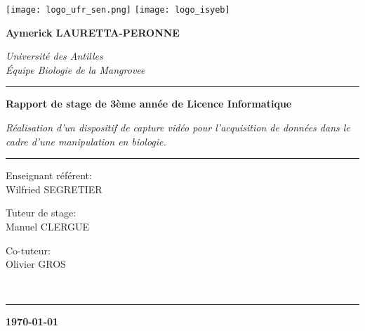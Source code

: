 \begin{titlepage}
    \begin{center}

        \texttt{[image: logo\_ufr\_sen.png]}
        \hspace{2cm}
        \texttt{[image: logo\_isyeb]} \\[2cm]
        \hspace{2cm}

        \textbf{\large{Aymerick LAURETTA-PERONNE}} \\

        \vspace{0.5cm}
                
		\textsl{\large{Université des Antilles}} \\[0.1cm]
        \small{\textit{Équipe Biologie de la Mangrovee}} \\[1cm]

        \vspace{1.5cm}

        \rule{\linewidth}{0.5mm}
        \textbf{Rapport de stage de 3ème année de Licence Informatique} 
        
        \vspace{0.5cm}

        \small{\textit{Réalisation d'un dispositif de capture vidéo pour l’acquisition de données dans le cadre d’une manipulation en biologie.}}
        \rule{\linewidth}{0.5mm}

        \vspace{2.5cm}
    
		\begin{minipage}{0.7\textwidth}
			\begin{flushleft}
				Enseignant référent: \\ 
				\hspace{0.2cm} Wilfried \textsc{SEGRETIER}
			\end{flushleft}
		\end{minipage}
        
		\vspace{-0.69cm}
		\hspace{9cm}
		\begin{minipage}{0.3\textwidth}
			\begin{flushleft}
				Tuteur de stage: \\
				\hspace{0.2cm} Manuel \textsc{CLERGUE}

				Co-tuteur: \\
				\hspace{0.2cm} Olivier \textsc{GROS}
			\end{flushleft}
		\end{minipage} \\[2cm]

        \rule{\linewidth}{0.5mm}
        \vfill
        \textbf{\today {}}
         
    \end{center}
\end{titlepage}